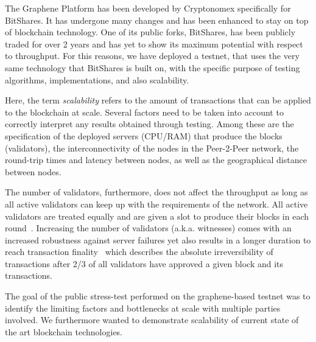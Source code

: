 The Graphene Platform has been developed by Cryptonomex specifically for
BitShares. It has undergone many changes and has been enhanced to stay on top of
blockchain technology. One of its public forks, BitShares, has been publicly traded
for over 2 years and has yet to show its maximum potential with respect to throughput.
For this reasons, we have deployed a testnet, that uses the very same technology that BitShares is built
on, with the specific purpose of testing algorithms, implementations, and also scalability.

Here, the term \emph{scalability} refers to the amount of transactions that can
be applied to the blockchain at scale. Several factors need to be taken into
account to correctly interpret any results obtained through testing. Among
these are the specification of the deployed servers (CPU/RAM) that produce the
blocks (validators), the interconnectivity of the nodes in the Peer-2-Peer
network, the round-trip times and latency between nodes, as well as the
geographical distance between nodes.

The number of validators, furthermore, does not affect the throughput as long
as all active validators can keep up with the requirements of the network. All
active validators are treated equally and are given a slot to produce their
blocks in each round~\cite{bts:general}. Increasing the number of validators
(a.k.a. witnesses) comes with an increased robustness against server failures
yet also results in a longer duration to reach transaction
finality~\cite{bts:general} which describes the absolute irreversibility of
transactions after 2/3 of all validators have approved a given block and its
transactions.

The goal of the public stress-test performed on the graphene-based testnet was
to identify the limiting factors and bottlenecks at scale with multiple parties
involved. We furthermore wanted to demonstrate scalability of current state of
the art blockchain technologies.
